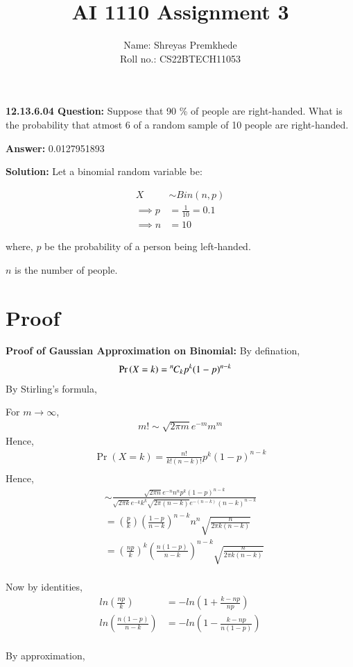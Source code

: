 \documentclass[journal,12pt,twocolumn]{IEEEtran}
\title{AI 1110 Assignment 3}
\providecommand{\pr}[1]{\ensuremath{\Pr\left(#1\right)}}
\theoremstyle{remark}
\newcommand{\permcomb}[4][0mu]{{{}^{#3}\mkern#1#2_{#4}}}
\newcommand{\comb}[1][-1mu]{\permcomb[#1]{C}}
\begin{document}
\author{Name: Shreyas Premkhede\\Roll no.: CS22BTECH11053}
\maketitle

\textbf{12.13.6.04 Question:} Suppose that 90 \% of people are right-handed. What is the probability that atmost 6 of a random sample of 10 people are right-handed. 


\textbf{Answer:}  0.0127951893


\textbf{Solution: } 
Let a binomial random variable be:

\begin{align} 
X &\sim Bin(n,p)\\
\implies p &= \frac{1}{10} = 0.1\\ 
\implies n &= 10
\end{align}	   

where, $p$ be the probability of a person being left-handed.

$n$ is the number of people.

\section{Proof}
\textbf{Proof of Gaussian Approximation on Binomial:}
By defination,
\begin{align}
\pr{X = k} &= \comb{n}{k} p^k (1-p)^{n-k}  
\end{align}
By Stirling's formula,

For \( m \to \infty\),
\begin{align}
m! \sim \sqrt{2\pi m}e^{-m}m^m
\end{align}
Hence,
\begin{align}
\pr{X = k} = \frac{n!}{k!(n-k)!} p^k (1-p)^{n-k}\\
\end{align}
Hence,
\begin{align}
&\sim \frac{\sqrt{2\pi n}e^{-n}n^n p^k (1-p)^{n-k}}{\sqrt{2\pi k}e^{-k}k^k \sqrt{2\pi (n-k)}e^{-(n-k)}(n-k)^{n-k}}\\
&= \left(\frac{p}{k}\right)\left(\frac{1-p}{n-k}\right)^{n-k}n^n \sqrt{\frac{n}{2\pi k (n-k)}}\\
&= \left(\frac{np}{k}\right)^{k}\left(\frac{n(1-p)}{n-k}\right)^{n-k}\sqrt{\frac{n}{2\pi k (n-k)}}
\end{align}
\\
Now by identities,
\begin{align}
ln\left(\frac{np}{k}\right)&= -ln\left(1 + \frac{k-np}{np}\right)\\
ln\left(\frac{n(1-p)}{n-k}\right)&= -ln\left(1 - \frac{k-np}{n(1-p)}\right)
\end{align}
\\
By approximation,
\end{document}
